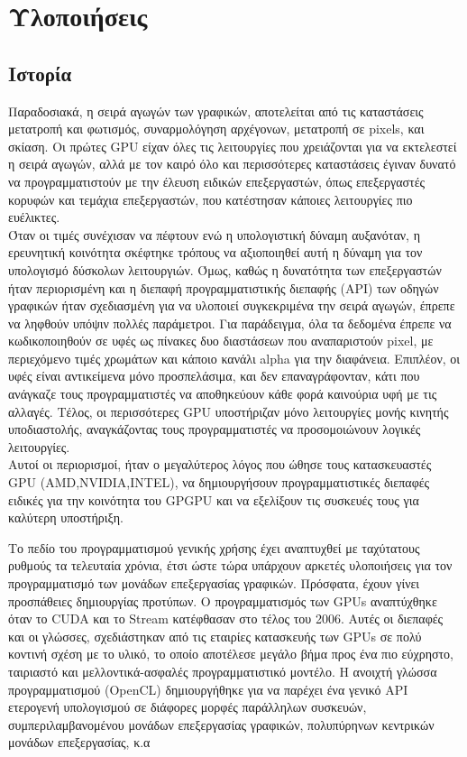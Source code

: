 \chapter{Υλοποιήσεις}
\section{Ιστορία}
Παραδοσιακά, η σειρά αγωγών των γραφικών, αποτελείται από τις καταστάσεις μετατροπή και φωτισμός, συναρμολόγηση αρχέγονων, μετατροπή σε pixels, και σκίαση. Οι πρώτες GPU είχαν όλες τις λειτουργίες που χρειάζονται για να εκτελεστεί η σειρά αγωγών, αλλά με τον καιρό όλο και περισσότερες καταστάσεις έγιναν δυνατό να προγραμματιστούν με την έλευση ειδικών επεξεργαστών, όπως επεξεργαστές κορυφών και τεμάχια επεξεργαστών, που κατέστησαν κάποιες λειτουργίες πιο ευέλικτες.\\
Όταν οι τιμές συνέχισαν να πέφτουν ενώ η υπολογιστική δύναμη αυξανόταν, η ερευνητική κοινότητα σκέφτηκε τρόπους να αξιοποιηθεί αυτή η δύναμη για τον υπολογισμό δύσκολων λειτουργιών. Όμως, καθώς η δυνατότητα των επεξεργαστών ήταν περιορισμένη και η διεπαφή προγραμματιστικής διεπαφής (API) των οδηγών γραφικών ήταν σχεδιασμένη για να υλοποιεί συγκεκριμένα την σειρά αγωγών, έπρεπε να ληφθούν υπόψιν πολλές παράμετροι. Για παράδειγμα, όλα τα δεδομένα έπρεπε να κωδικοποιηθούν σε υφές ως πίνακες δυο διαστάσεων που αναπαριστούν pixel, με περιεχόμενο τιμές χρωμάτων και κάποιο κανάλι alpha για την διαφάνεια. Επιπλέον, οι υφές είναι αντικείμενα μόνο προσπελάσιμα, και δεν επαναγράφονταν, κάτι που ανάγκαζε τους προγραμματιστές να αποθηκεύουν κάθε φορά καινούρια υφή με τις αλλαγές. Τέλος, οι περισσότερες GPU υποστήριζαν μόνο λειτουργίες μονής κινητής υποδιαστολής, αναγκάζοντας τους προγραμματιστές να προσομοιώνουν λογικές λειτουργίες.\\
Αυτοί οι περιορισμοί, ήταν ο μεγαλύτερος λόγος που ώθησε τους κατασκευαστές GPU (AMD,NVIDIA,INTEL), να δημιουργήσουν προγραμματιστικές διεπαφές ειδικές για την κοινότητα του GPGPU και να εξελίξουν τις συσκευές τους για καλύτερη υποστήριξη.

Το πεδίο του προγραμματισμού γενικής χρήσης έχει αναπτυχθεί με ταχύτατους ρυθμούς τα τελευταία χρόνια, έτσι ώστε τώρα υπάρχουν αρκετές υλοποιήσεις για τον προγραμματισμό των μονάδων επεξεργασίας γραφικών. Πρόσφατα, έχουν γίνει προσπάθειες δημιουργίας προτύπων.
Ο προγραμματισμός των GPUs αναπτύχθηκε όταν το CUDA και το Stream κατέφθασαν στο τέλος του 2006. Αυτές οι διεπαφές και οι γλώσσες, σχεδιάστηκαν από τις εταιρίες κατασκευής των GPUs σε πολύ κοντινή σχέση με το υλικό, το οποίο αποτέλεσε μεγάλο βήμα προς ένα πιο εύχρηστο, ταιριαστό και μελλοντικά-ασφαλές προγραμματιστικό μοντέλο. Η ανοιχτή γλώσσα προγραμματισμού (OpenCL) δημιουργήθηκε για να παρέχει ένα γενικό API ετερογενή υπολογισμού σε διάφορες μορφές παράλληλων συσκευών, συμπεριλαμβανομένου μονάδων επεξεργασίας γραφικών, πολυπύρηνων κεντρικών μονάδων επεξεργασίας, κ.α

